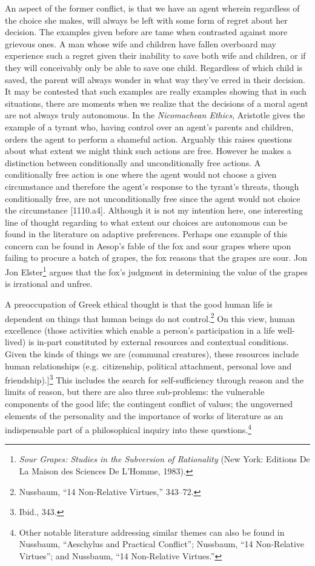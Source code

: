 \documentclass[phdthesis,12pt,final]{wuthesis}
\theoremstyle{definition}
\theoremstyle{definition}
\theoremstyle{definition}
\theoremstyle{definition}
\theoremstyle{remark}
\begin{document}
An aspect of the former conflict, is that we have an agent wherein regardless of the choice she makes, will always be left with some form of regret about her decision. The examples given before are tame when contrasted against more grievous ones. A man whose wife and children have fallen overboard may experience such a regret given their inability to save both wife and children, or if they will conceivably only be able to save one child. Regardless of which child is saved, the parent will always wonder in what way they've erred in their decision. It may be contested that such examples are really examples showing that in such situations, there are moments when we realize that the decisions of a moral agent are not always truly autonomous. In the \emph{Nicomachean Ethics}, Aristotle gives the example of a tyrant who, having control over an agent's parents and children, orders the agent to perform a shameful action. Arguably this raises questions about what extent we might think such actions are free. However he makes a distinction between conditionally and unconditionally free actions. A conditionally free action is one where the agent would not choose a given circumstance and therefore the agent's response to the tyrant's threats, though conditionally free, are not unconditionally free since the agent would not choice the circumstance {[}1110.a4{]}. Although it is not my intention here, one interesting line of thought regarding to what extent our choices are autonomous can be found in the literature on adaptive preferences. Perhaps one example of this concern can be found in Aesop's fable of the fox and sour grapes where upon failing to procure a batch of grapes, the fox reasons that the grapes are sour. Jon Jon Elster\footnote{\emph{Sour {Grapes}: {Studies} in the {Subversion} of {Rationality}} (New York: Editions De La Maison des Sciences De L'Homme, 1983).} argues that the fox's judgment in determining the value of the grapes is irrational and unfree.

A preoccupation of Greek ethical thought is that the good human life is dependent on things that human beings do not control.\footnote{Nussbaum, {``14 {Non-Relative Virtues},''} 343--72.} On this view, human excellence (those activities which enable a person's participation in a life well-lived) is in-part constituted by external resources and contextual conditions. Given the kinds of things we are (communal creatures), these resources include human relationships (e.g.~citizenship, political attachment, personal love and friendship).{]}\footnote{Ibid., 343.} This includes the search for self-sufficiency through reason and the limits of reason, but there are also three sub-problems: the vulnerable components of the good life; the contingent conflict of values; the ungoverned elements of the personality and the importance of works of literature as an indispensable part of a philosophical inquiry into these questions.\footnote{Other notable literature addressing similar themes can also be found in Nussbaum, {``Aeschylus and Practical Conflict''}; Nussbaum, {``14 {Non-Relative Virtues}''}; and Nussbaum, {``14 {Non-Relative Virtues}.''}}
\end{document}
